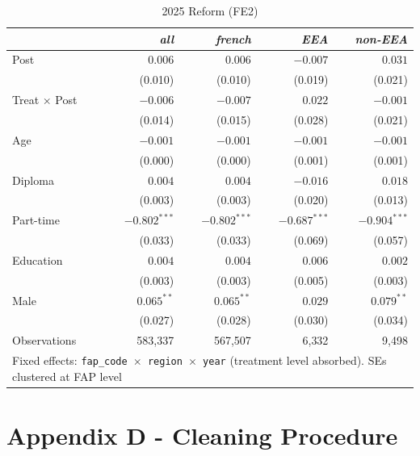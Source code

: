 \documentclass[10pt, a4paper]{article}
\begin{document}
\begin{table}[h!]
\caption{2025 Reform (FE2)\label{tab:did2025_fe2}}
\centering
\setlength{\tabcolsep}{25pt}
\begin{tabular}{lrrrr}
 & \textit{all} & \textit{french} & \textit{EEA} & \textit{non-EEA} \\
\midrule
\midrule
Post & $0.006$ & $0.006$ & $-0.007$ & $0.031$ \\
 & (0.010) & (0.010) & (0.019) & (0.021) \\[2pt]
Treat$\,\times\,$Post & $-0.006$ & $-0.007$ & $0.022$ & $-0.001$ \\
 & (0.014) & (0.015) & (0.028) & (0.021) \\[2pt]
\midrule
Age & $-0.001$ & $-0.001$ & $-0.001$ & $-0.001$ \\
 & (0.000) & (0.000) & (0.001) & (0.001) \\[2pt]
Diploma & $0.004$ & $0.004$ & $-0.016$ & $0.018$ \\
 & (0.003) & (0.003) & (0.020) & (0.013) \\[2pt]
Part-time & $-0.802^{***}$ & $-0.802^{***}$ & $-0.687^{***}$ & $-0.904^{***}$ \\
 & (0.033) & (0.033) & (0.069) & (0.057) \\[2pt]
Education & $0.004$ & $0.004$ & $0.006$ & $0.002$ \\
 & (0.003) & (0.003) & (0.005) & (0.003) \\[2pt]
Male & $0.065^{**}$ & $0.065^{**}$ & $0.029$ & $0.079^{**}$ \\
 & (0.027) & (0.028) & (0.030) & (0.034) \\[2pt]
\midrule
Observations & 583{,}337 & 567{,}507 & 6{,}332 & 9{,}498 \\
\bottomrule
\multicolumn{5}{p{0.88\linewidth}}{\footnotesize Fixed effects: \texttt{fap\_code $\times$ region $\times$ year} (treatment level absorbed). SEs clustered at FAP level}\\
\end{tabular}
\end{table}

\clearpage
\section*{Appendix D - Cleaning Procedure}
\end{document}
